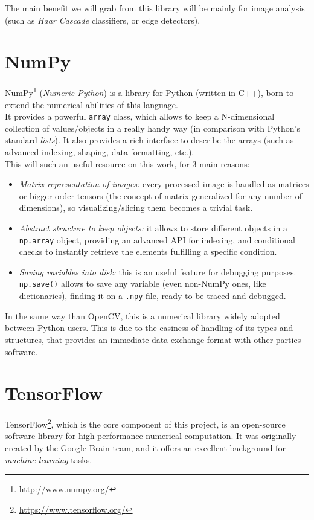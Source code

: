 	The main benefit we will grab from this library will be mainly for image analysis (such as \emph{Haar Cascade} classifiers, or edge detectors).\\

\section{NumPy}
	NumPy\footnote{\url{http://www.numpy.org/}} (\emph{Numeric Python}) is a library for Python (written in C++), born to extend the numerical abilities of this language.\\
	
	It provides a powerful \texttt{array} class, which allows to keep a N-dimensional collection of values/objects in a really handy way (in comparison with Python's standard \emph{lists}). It also provides a rich interface to describe the arrays (such as advanced indexing, shaping, data formatting, etc.).\\
	This will such an useful resource on this work, for 3 main reasons:
	\begin{itemize}
		\item \emph{Matrix representation of images:} every processed image is handled as matrices or bigger order tensors (the concept of matrix generalized for any number of dimensions), so visualizing/slicing them becomes a trivial task.
		\item \emph{Abstract structure to keep objects:} it allows to store different objects in a \texttt{np.array} object, providing an advanced API for indexing, and conditional checks to instantly retrieve the elements fulfilling a specific condition.
		\item \emph{Saving variables into disk:} this is an useful feature for debugging purposes. \texttt{np.save()} allows to save any variable (even non-NumPy ones, like dictionaries), finding it on a \texttt{.npy} file, ready to be traced and debugged.
	\end{itemize}

In the same way than OpenCV, this is a numerical library widely adopted between Python users. This is due to the easiness of handling of its types and structures, that provides an immediate data exchange format with other parties software.



\section{TensorFlow}
	\label{sec:3_tensorflow}
	TensorFlow\footnote{\url{https://www.tensorflow.org/}}, which is the core component of this project, is an open-source software library for high performance numerical computation. It was originally created by the Google Brain team, and it offers an excellent background for \emph{machine learning} tasks.\\
	
